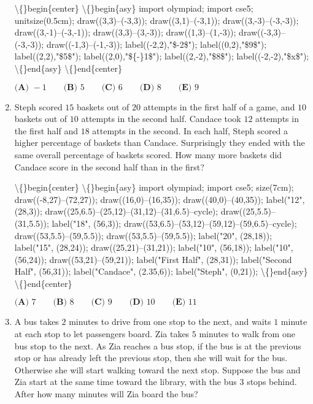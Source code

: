 \documentclass{article}
\begin{document}
\begin{enumerate}[label=\arabic*., itemsep=0.5em]
\textbackslash\{\}begin\{center\}
\textbackslash\{\}begin\{asy\}
import olympiad;
import cse5;
unitsize(0.5cm);
draw((3,3)--(-3,3));
draw((3,1)--(-3,1));
draw((3,-3)--(-3,-3));
draw((3,-1)--(-3,-1));
draw((3,3)--(3,-3));
draw((1,3)--(1,-3));
draw((-3,3)--(-3,-3));
draw((-1,3)--(-1,-3));
label((-2,2),"\$-2\$");
label((0,2),"\$9\$");
label((2,2),"\$5\$");
label((2,0),"\$\{-\}1\$");
label((2,-2),"\$8\$");
label((-2,-2),"\$x\$");
\textbackslash\{\}end\{asy\}
\textbackslash\{\}end\{center\}

\(\textbf{(A) } {-}1 \qquad \textbf{(B) } 5 \qquad \textbf{(C) } 6 \qquad \textbf{(D) } 8 \qquad \textbf{(E) } 9\)\par \vspace{0.5em}\item Steph scored \(15\) baskets out of \(20\) attempts in the first half of a game, and \(10\) baskets out of \(10\) attempts in the second half. Candace took \(12\) attempts in the first half and \(18\) attempts in the second. In each half, Steph scored a higher percentage of baskets than Candace. Surprisingly they ended with the same overall percentage of baskets scored. How many more baskets did Candace score in the second half than in the first? 

\textbackslash\{\}begin\{center\}
\textbackslash\{\}begin\{asy\}
import olympiad;
import cse5;
size(7cm);
draw((-8,27)--(72,27));
draw((16,0)--(16,35));
draw((40,0)--(40,35));
label("12", (28,3));
draw((25,6.5)--(25,12)--(31,12)--(31,6.5)--cycle);
draw((25,5.5)--(31,5.5));
label("18", (56,3));
draw((53,6.5)--(53,12)--(59,12)--(59,6.5)--cycle);
draw((53,5.5)--(59,5.5));
draw((53,5.5)--(59,5.5));
label("20", (28,18));
label("15", (28,24));
draw((25,21)--(31,21));
label("10", (56,18));
label("10", (56,24));
draw((53,21)--(59,21));
label("First Half", (28,31));
label("Second Half", (56,31));
label("Candace", (2.35,6));
label("Steph", (0,21));
\textbackslash\{\}end\{asy\}
\textbackslash\{\}end\{center\}

\(\textbf{(A) } 7\qquad\textbf{(B) } 8\qquad\textbf{(C) } 9\qquad\textbf{(D) } 10\qquad\textbf{(E) } 11\)\par \vspace{0.5em}\item A bus takes \(2\) minutes to drive from one stop to the next, and waits \(1\) minute at each stop to let passengers board. Zia takes \(5\) minutes to walk from one bus stop to the next. As Zia reaches a bus stop, if the bus is at the previous stop or has already left the previous stop, then she will wait for the bus. Otherwise she will start walking toward the next stop. Suppose the bus and Zia start at the same time toward the library, with the bus \(3\) stops behind. After how many minutes will Zia board the bus?




\end{enumerate}
\end{document}
